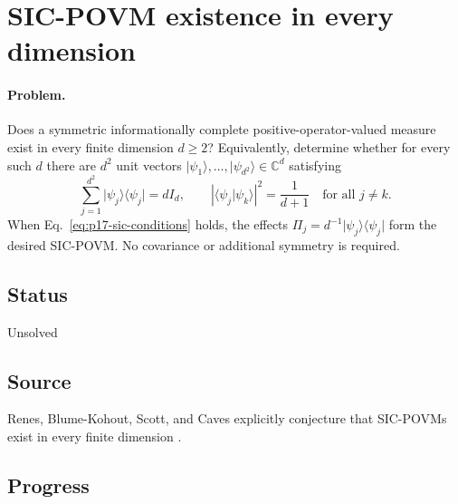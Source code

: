 \section{SIC-POVM existence in every dimension}
\label{sec:problem-17}

\paragraph{Problem.}
Does a symmetric informationally complete positive-operator-valued measure
exist in every finite dimension $d\ge2$?  Equivalently, determine whether for
every such $d$ there are $d^2$ unit vectors
$\lvert\psi_1\rangle,\ldots,\lvert\psi_{d^2}\rangle\in\mathbb{C}^d$
satisfying
\begin{equation}
  \sum_{j=1}^{d^2}
    \lvert\psi_j\rangle\!\langle\psi_j\rvert=dI_d,
  \qquad
  \left|\langle\psi_j\vert\psi_k\rangle\right|^2
    =\frac{1}{d+1}
  \quad\text{for all }j\ne k.
  \label{eq:p17-sic-conditions}
\end{equation}
When Eq.~\eqref{eq:p17-sic-conditions} holds, the effects
$\Pi_j=d^{-1}\lvert\psi_j\rangle\!\langle\psi_j\rvert$ form the desired
SIC-POVM.  No covariance or additional symmetry is required.

\subsection*{Status}

Unsolved

\subsection*{Source}

Renes, Blume-Kohout, Scott, and Caves explicitly conjecture that SIC-POVMs
exist in every finite dimension .

\subsection*{Progress}

